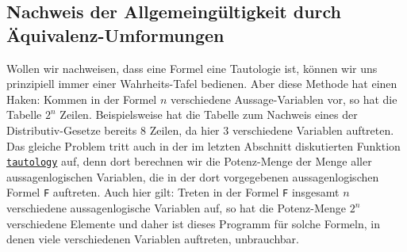 \subsection{Nachweis der Allgemeingültigkeit durch Äquivalenz-Umformungen}
Wollen wir nachweisen, dass eine Formel eine Tautologie ist, können wir uns prinzipiell
immer einer Wahrheits-Tafel bedienen. 
Aber diese Methode hat einen Haken: Kommen in der Formel $n$
verschiedene Aussage-Variablen vor, so hat die Tabelle $2^n$ Zeilen.  Beispielsweise hat
die Tabelle zum Nachweis eines der Distributiv-Gesetze bereits 
$8$ Zeilen, da hier 3 verschiedene Variablen auftreten.
Das gleiche Problem tritt auch in der im letzten Abschnitt diskutierten Funktion
\href{https://github.com/karlstroetmann/Logic/blob/master/Python/tautology.py}{\texttt{tautology}} auf,
denn dort berechnen wir die Potenz-Menge der Menge aller aussagenlogischen Variablen, die in der dort
vorgegebenen aussagenlogischen Formel \texttt{F} auftreten.  Auch hier gilt:  Treten in der Formel \texttt{F}
insgesamt $n$ verschiedene aussagenlogische Variablen auf, so hat die Potenz-Menge $2^n$ verschiedene Elemente
und daher ist dieses Programm für solche Formeln, in denen viele verschiedenen Variablen auftreten, unbrauchbar.

